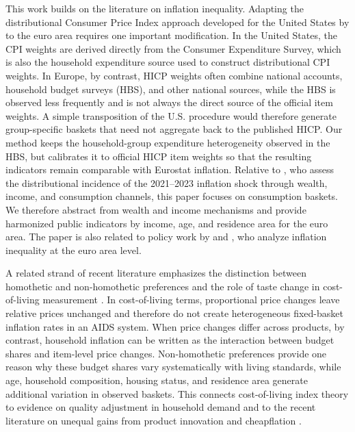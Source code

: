 \documentclass[11pt]{article}
\begin{document}

This work builds on the literature on inflation inequality. Adapting the distributional Consumer Price Index approach
developed for the United States by \cite{jaravel2024distributional} to the euro area requires one
important modification. In the United States, the CPI weights are derived directly
from the Consumer Expenditure Survey, which is also the household expenditure source used to
construct distributional CPI weights. In Europe, by contrast, HICP weights often combine national
accounts, household budget surveys (HBS), and other national sources, while the HBS is observed less
frequently and is not always the direct source of the official item weights. A simple transposition
of the U.S. procedure would therefore generate group-specific baskets that need not aggregate back
to the published HICP. Our method keeps the household-group expenditure heterogeneity observed in
the HBS, but calibrates it to official HICP item weights so that the resulting indicators remain
comparable with Eurostat inflation. Relative to \cite{pallotti2024bears}, who assess the
distributional incidence of the 2021--2023 inflation shock through wealth, income, and consumption
channels, this paper focuses on consumption baskets. We therefore abstract from wealth and income
mechanisms and provide harmonized public indicators by income, age, and residence area for the euro
area. The paper is also related to policy work by \cite{bobasu2023impact} and
\cite{claeys2022inflation}, who analyze inflation inequality at the
euro area level.

A related strand of recent literature emphasizes the distinction between homothetic and
non-homothetic preferences and the role of taste change in cost-of-living measurement
\citep{redding2020measuring,martin2022revisiting}. In cost-of-living terms, proportional price
changes leave relative prices unchanged and therefore do not create heterogeneous fixed-basket
inflation rates in an AIDS system. When price changes differ across products, by contrast, household
inflation can be written as the interaction between budget shares and item-level price changes.
Non-homothetic preferences provide one reason why these budget shares vary systematically with
living standards, while age, household composition, housing status, and residence area generate
additional variation in observed baskets. This connects cost-of-living index theory to evidence on
quality adjustment in household demand \citep{coxWohlgenant1986prices,deaton1988quality} and to the
recent literature on unequal gains from product innovation and cheapflation
\citep{jaravel2019unequal,chen2024cheapflation,sangani2026cheapflation}.
\end{document}
